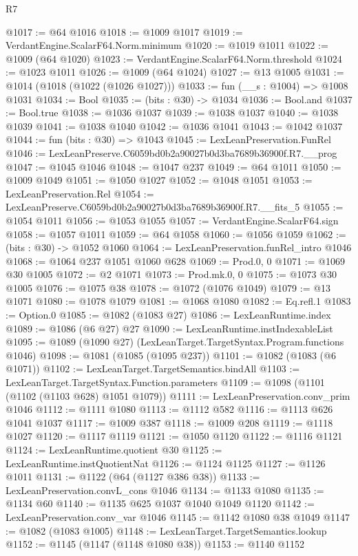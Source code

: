 \begin{lexlean}{R7}
\begin{coremodule}
@1017 := @64 @1016
@1018 := @1009 @1017
@1019 := VerdantEngine.ScalarF64.Norm.minimum
@1020 := @1019 @1011
@1022 := @1009 (@64 @1020)
@1023 := VerdantEngine.ScalarF64.Norm.threshold
@1024 := @1023 @1011
@1026 := @1009 (@64 @1024)
@1027 := @13 @1005
@1031 := @1014 (@1018 (@1022 (@1026 @1027)))
@1033 := fun (__s : @1004) => @1008 @1031
@1034 := Bool
@1035 := (bits : @30) -> @1034
@1036 := Bool.and
@1037 := Bool.true
@1038 := @1036 @1037
@1039 := @1038 @1037
@1040 := @1038 @1039
@1041 := @1038 @1040
@1042 := @1036 @1041
@1043 := @1042 @1037
@1044 := fun (bits : @30) => @1043
@1045 := LexLeanPreservation.FunRel
@1046 := LexLeanPreserve.C6059bd0b2a90027b0d3ba7689b36900f.R7.__prog
@1047 := @1045 @1046
@1048 := @1047 @237
@1049 := @64 @1011
@1050 := @1009 @1049
@1051 := @1050 @1027
@1052 := @1048 @1051
@1053 := LexLeanPreservation.Rel
@1054 := LexLeanPreserve.C6059bd0b2a90027b0d3ba7689b36900f.R7.__fits_5
@1055 := @1054 @1011
@1056 := @1053 @1055
@1057 := VerdantEngine.ScalarF64.sign
@1058 := @1057 @1011
@1059 := @64 @1058
@1060 := @1056 @1059
@1062 := (bits : @30) -> @1052 @1060
@1064 := LexLeanPreservation.funRel_intro @1046
@1068 := @1064 @237 @1051 @1060 @628
@1069 := Prod.{0, 0}
@1071 := @1069 @30 @1005
@1072 := @2 @1071
@1073 := Prod.mk.{0, 0}
@1075 := @1073 @30 @1005
@1076 := @1075 @38
@1078 := @1072 (@1076 @1049)
@1079 := @13 @1071
@1080 := @1078 @1079
@1081 := @1068 @1080
@1082 := Eq.refl.{1}
@1083 := Option.{0}
@1085 := @1082 (@1083 @27)
@1086 := LexLeanRuntime.index
@1089 := @1086 (@6 @27) @27
@1090 := LexLeanRuntime.instIndexableList
@1095 := @1089 (@1090 @27) (LexLeanTarget.TargetSyntax.Program.functions @1046)
@1098 := @1081 (@1085 (@1095 @237))
@1101 := @1082 (@1083 (@6 @1071))
@1102 := LexLeanTarget.TargetSemantics.bindAll
@1103 := LexLeanTarget.TargetSyntax.Function.parameters
@1109 := @1098 (@1101 (@1102 (@1103 @628) @1051 @1079))
@1111 := LexLeanPreservation.conv_prim @1046
@1112 := @1111 @1080
@1113 := @1112 @582
@1116 := @1113 @626 @1041 @1037
@1117 := @1009 @387
@1118 := @1009 @208
@1119 := @1118 @1027
@1120 := @1117 @1119
@1121 := @1050 @1120
@1122 := @1116 @1121
@1124 := LexLeanRuntime.quotient @30
@1125 := LexLeanRuntime.instQuotientNat
@1126 := @1124 @1125
@1127 := @1126 @1011
@1131 := @1122 (@64 (@1127 @386 @38))
@1133 := LexLeanPreservation.convL_cons @1046
@1134 := @1133 @1080
@1135 := @1134 @60
@1140 := @1135 @625 @1037 @1040 @1049 @1120
@1142 := LexLeanPreservation.conv_var @1046
@1145 := @1142 @1080 @38 @1049
@1147 := @1082 (@1083 @1005)
@1148 := LexLeanTarget.TargetSemantics.lookup
@1152 := @1145 (@1147 (@1148 @1080 @38))
@1153 := @1140 @1152

\end{coremodule}
\end{lexlean}
